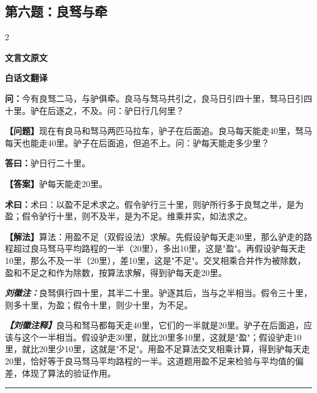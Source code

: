\documentclass[10pt,a4paper]{article}
\newcommand{\wen}[1]{\textbf{\color{problemcolor}问：}#1\par}
\newcommand{\da}[1]{\textbf{答曰：}#1\par}
\newcommand{\shu}[1]{\textbf{术曰：}#1\par}
\newcommand{\liuhui}[1]{{\color{commentarycolor}\textit{\textbf{刘徽注：}}#1\par}}
\newcommand{\classicalheader}[1]{{\centering\large\bfseries\color{classicalcolor} #1\par\vspace{0.5em}}}
\newcommand{\wenmodern}[1]{\textbf{\color{moderncolor}【问题】}#1\par}
\newcommand{\damodern}[1]{\textbf{【答案】}#1\par}
\newcommand{\shumodern}[1]{\textbf{【解法】}#1\par}
\newcommand{\liuhuimodern}[1]{{\color{commentarycolor}\textit{\textbf{【刘徽注释】}}#1\par}}
\newcommand{\modernheader}[1]{{\centering\large\bfseries\color{moderncolor} #1\par\vspace{0.5em}}}
\newcommand{\problemsec}[1]{\subsection*{#1}}
\begin{document}
\problemsec{第六题：良驽与牵}
\begin{paracol}{2}
\classicalheader{文言文原文}
\switchcolumn
\modernheader{白话文翻译}
\switchcolumn*

\wen{今有良驽二马，与驴俱牵。良马与驽马共引之，良马日引四十里，驽马日引四十里。驴在后逐之，不及。问：驴日行几何里？}

\switchcolumn

\wenmodern{现在有良马和驽马两匹马拉车，驴子在后面追。良马每天能走40里，驽马每天也能走40里。驴子在后面追，但追不上。问：驴每天能走多少里？}

\switchcolumn*

\da{驴日行二十里。}

\switchcolumn

\damodern{驴每天能走20里。}

\switchcolumn*

\shu{术曰：以盈不足术求之。假令驴行三十里，则驴所行多于良驽之半，是为盈；假令驴行十里，则不及半，是为不足。维乘并实，如法求之。}

\switchcolumn

\shumodern{算法：用盈不足（双假设法）求解。先假设驴每天走30里，那么驴走的路程超过良马驽马平均路程的一半（20里），多出10里，这是"盈"。再假设驴每天走10里，那么不及一半（20里），差10里，这是"不足"。交叉相乘合并作为被除数，盈和不足之和作为除数，按算法求解，得到驴每天走20里。}

\switchcolumn*

\liuhui{良驽俱行四十里，其半二十里。驴逐其后，当与之半相当。假令三十里，则多十里，为盈；假令十里，则少十里，为不足。}

\switchcolumn

\liuhuimodern{良马和驽马都每天走40里，它们的一半就是20里。驴子在后面追，应该与这个一半相当。假设驴走30里，就比20里多10里，这就是"盈"；假设驴走10里，就比20里少10里，这就是"不足"。用盈不足算法交叉相乘计算，得到驴每天走20里，恰好等于良马驽马平均路程的一半。这道题用盈不足来检验与平均值的偏差，体现了算法的验证作用。}

\end{paracol}

\vspace{0.3cm}
\hrule
\vspace{0.3cm}
\end{document}
